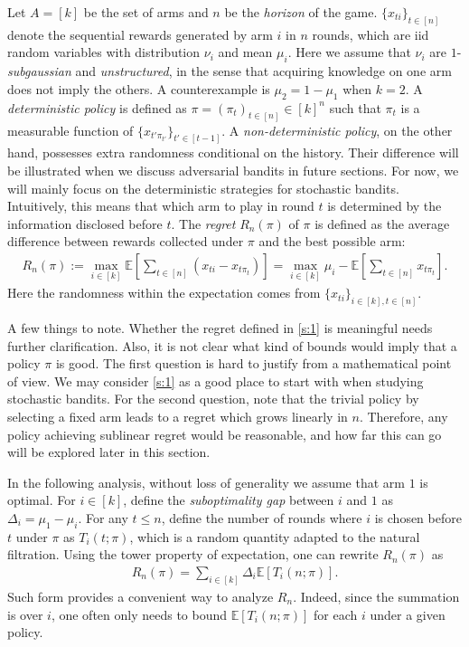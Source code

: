 \documentclass[10pt,a4paper]{amsart}
\numberwithin{equation}{section}
\theoremstyle{plain}
\theoremstyle{definition}
\def\E{{\mathbb E}}
\begin{document}
Let $A=[k]$ be the set of arms and $n$ be the \emph{horizon} of the game. $\{x_{ti}\}_{t\in [n]}$ denote the sequential rewards generated by arm $i$ in $n$ rounds, which are iid random variables with distribution $\nu_i$ and mean $\mu_i$. Here we assume that $\nu_i$ are $1$-\emph{subgaussian} and \emph{unstructured}, in the sense that acquiring knowledge on one arm does not imply the others. A counterexample is $\mu_2=1-\mu_1$ when $k= 2$. A \emph{deterministic policy} is defined as $\pi = (\pi_t)_{t\in [n]}\in [k]^n$ such that $\pi_t$ is a measurable function of $\{x_{t'\pi_{t'}}\}_{t'\in [t-1]}$. A \emph{non-deterministic policy}, on the other hand, possesses extra randomness conditional on the history. Their difference will be illustrated when we discuss adversarial bandits in future sections. For now, we will mainly focus on the deterministic strategies for stochastic bandits. Intuitively, this means that which arm to play in round $t$ is determined by the information disclosed before $t$. The \emph{regret} $R_n(\pi)$ of $\pi$ is defined as the average difference between rewards collected under $\pi$ and the best possible arm:
\begin{align}
R_n(\pi):=\max_{i\in [k]}\E\left[\sum_{t\in [n]}(x_{ti}-x_{t\pi_t})\right]=\max_{i\in [k]}\mu_i -\E\left[\sum_{t\in [n]}x_{t\pi_t}\right]. \label{s:1}
\end{align}
Here the randomness within the expectation comes from $\{x_{ti}\}_{i\in [k], t\in [n]}$.

A few things to note. Whether the regret defined in \eqref{s:1} is meaningful needs further clarification. Also, it is not clear what kind of bounds would imply that a policy $\pi$ is good. The first question is hard to justify from a mathematical point of view. We may consider \eqref{s:1} as a good place to start with when studying stochastic bandits.  For the second question, note that the trivial policy by selecting a fixed arm leads to a regret which grows linearly in $n$.  Therefore, any policy achieving sublinear regret would be reasonable, and how far this can go will be explored later in this section.

In the following analysis, without loss of generality we assume that arm $1$ is optimal. For $i\in [k]$, define the \emph{suboptimality gap} between $i$ and $1$ as $\Delta_i=\mu_1-\mu_i$. For any $t\leq n$, define the number of rounds where $i$ is chosen before $t$ under $\pi$ as $T_i(t; \pi)$, which is a random quantity adapted to the natural filtration. Using the tower property of expectation, one can rewrite $R_n(\pi)$ as 
\begin{align}
R_n(\pi)=\sum_{i\in [k]}\Delta_i\E[T_i(n; \pi)].\label{s:2}
\end{align} 
Such form provides a convenient way to analyze $R_n$.  Indeed, since the summation is over $i$, one often only needs to bound $\E[T_i(n; \pi)]$ for each $i$ under a given policy.  
\end{document}
